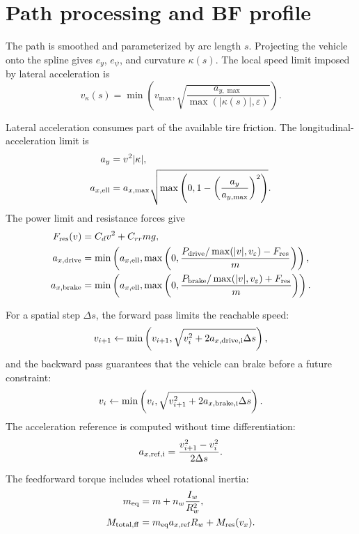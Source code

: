 \documentclass[11pt,a4paper]{article}
\begin{document}
\section{Path processing and BF profile}

The path is smoothed and parameterized by arc length $s$. Projecting the
vehicle onto the spline gives $e_y$, $e_\psi$, and curvature $\kappa(s)$.
The local speed limit imposed by lateral acceleration is
\begin{equation}
 v_\kappa(s)=
 \min\left(v_{\max},
 \sqrt{\frac{a_{y,\max}}{\max(|\kappa(s)|,\varepsilon)}}\right).
\end{equation}

Lateral acceleration consumes part of the available tire friction. The
longitudinal-acceleration limit is
\begin{align}
 a_y &= v^2|\kappa|,\\
 a_{x,\rm ell} &=
 a_{x,\max}\sqrt{\max\left(0,1-
 \left(\frac{a_y}{a_{y,\max}}\right)^2\right)}.
\end{align}
The power limit and resistance forces give
\begin{align}
 F_{\rm res}(v)&=C_dv^2+C_{rr}mg,\\
 a_{x,\rm drive}&=\min\left(a_{x,\rm ell},
 \max\left(0,\frac{P_{\rm drive}/\max(|v|,v_\varepsilon)
 -F_{\rm res}}{m}\right)\right),\\
 a_{x,\rm brake}&=\min\left(a_{x,\rm ell},
 \max\left(0,\frac{P_{\rm brake}/\max(|v|,v_\varepsilon)
 +F_{\rm res}}{m}\right)\right).
\end{align}

For a spatial step $\Delta s$, the forward pass limits the reachable speed:
\begin{equation}
 v_{i+1}\leftarrow\min\left(v_{i+1},
 \sqrt{v_i^2+2a_{x,\rm drive,i}\Delta s}\right),
\end{equation}
and the backward pass guarantees that the vehicle can brake before a future
constraint:
\begin{equation}
 v_i\leftarrow\min\left(v_i,
 \sqrt{v_{i+1}^2+2a_{x,\rm brake,i}\Delta s}\right).
\end{equation}
The acceleration reference is computed without time differentiation:
\begin{equation}
 a_{x,\rm ref,i}=\frac{v_{i+1}^2-v_i^2}{2\Delta s}.
\end{equation}

The feedforward torque includes wheel rotational inertia:
\begin{align}
 m_{\rm eq}&=m+n_w\frac{I_w}{R_w^2},\\
 M_{\rm total,ff}&=m_{\rm eq}a_{x,\rm ref}R_w+M_{\rm res}(v_x).
\end{align}
\end{document}
